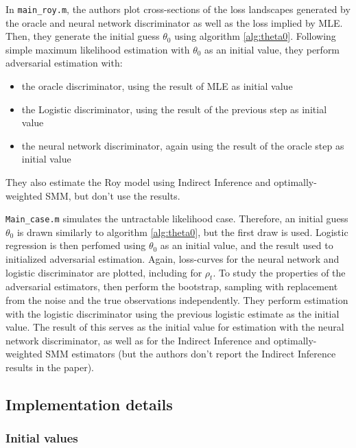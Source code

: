 In \texttt{main\_roy.m}, the authors plot cross-sections of the loss landscapes generated by the oracle and neural network discriminator as well as the loss implied by MLE. %
Then, they generate the initial guess $\theta_0$ using algorithm \ref{alg:theta0}.
Following simple maximum likelihood estimation with $\theta_0$ as an initial value, they perform adversarial estimation with:
\begin{itemize}
    \item the oracle discriminator, using the result of MLE as initial value
    \item the Logistic discriminator, using the result of the previous step as initial value
    \item the neural network discriminator, again using the result of the oracle step as initial value
\end{itemize} 
They also estimate the Roy model using Indirect Inference and optimally-weighted SMM, but don't use the results.

\texttt{Main\_case.m} simulates the untractable likelihood case.
Therefore, an initial guess $\theta_0$ is drawn similarly to algorithm \ref{alg:theta0}, but the first draw is used.
Logistic regression is then perfomed using $\theta_0$ as an initial value, and the result used to initialized adversarial estimation. %
Again, loss-curves for the neural network and logistic discriminator are plotted, including for $\rho_t$.
To study the properties of the adversarial estimators, \textcite{kaji2023adversarial} then perform the bootstrap, sampling with replacement from the noise and the true observations independently.
They perform estimation with the logistic discriminator using the previous logistic estimate as the initial value. %
The result of this serves as the initial value for estimation with the neural network discriminator, as well as for the Indirect Inference and optimally-weighted SMM estimators (but the authors don't report the Indirect Inference results in the paper). %


\subsection{Implementation details}
\label{sec:Implementation}

\subsubsection{Initial values}
\label{sec:initial_values}

